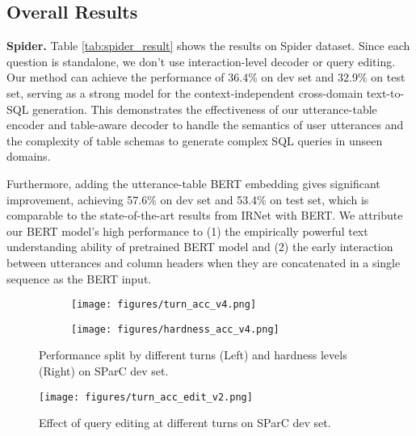 \documentclass[11pt,a4paper]{article}
\begin{document}
\subsection{Overall Results}
\textbf{Spider.}
Table \ref{tab:spider_result} shows the results on Spider dataset.
Since each question is standalone, we don't use interaction-level decoder or query editing.
Our method can achieve the performance of 36.4\% on dev set and 32.9\% on test set, serving as a strong model for the context-independent cross-domain text-to-SQL generation.
This demonstrates the effectiveness of our utterance-table encoder and table-aware decoder to handle the semantics of user utterances and the complexity of table schemas to generate complex SQL queries in unseen domains.

Furthermore, adding the utterance-table BERT embedding gives significant improvement, achieving 57.6\% on dev set and 53.4\% on test set, which is comparable to the state-of-the-art results from IRNet with BERT.
We attribute our BERT model's high performance to (1) the empirically powerful text understanding ability of pretrained BERT model and (2) the early interaction between utterances and column headers when they are concatenated in a single sequence as the BERT input.

\begin{figure*}[t!]
     \centering
     \begin{subfigure}[t]{0.46\textwidth}
         \centering
         \texttt{[image: figures/turn\_acc\_v4.png]}
         \vspace{-2mm}
         \label{fig:turn_acc}
     \end{subfigure}\begin{subfigure}[t]{0.46\textwidth}
         \centering
         \texttt{[image: figures/hardness\_acc\_v4.png]}
         \vspace{-2mm}
         \label{fig:hardness_acc}
     \end{subfigure}
     \vspace{-5mm}
\caption{Performance split by different turns (Left) and hardness levels (Right) on SParC dev set.}
\vspace{-4mm}
\label{fig:sparc_dev}
\end{figure*}

\begin{figure}[t!]
  \centering
  \texttt{[image: figures/turn\_acc\_edit\_v2.png]}
  \caption{Effect of query editing at different turns on SParC dev set.}
  \vspace{-5mm}
  \label{fig:turn_acc_edit}
\end{figure}
\end{document}
